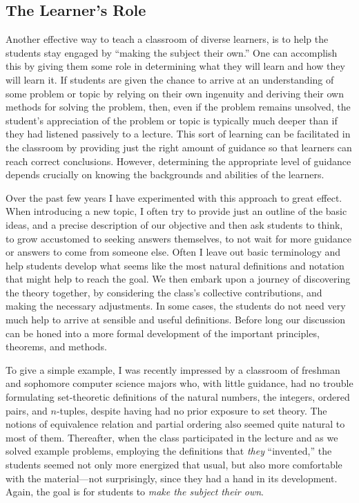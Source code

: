 \subsection{The Learner's Role} Another effective way to teach a classroom of diverse learners, is to help the students stay engaged by ``making the subject their own.''  One can accomplish this by giving them some role in determining what they will learn and how they will learn it.  If students are given the chance to arrive at an understanding of some problem or topic by relying on their own ingenuity and deriving their own methods for solving the problem, then, even if the problem remains unsolved, the student's appreciation of the problem or topic is typically much deeper than if they had listened passively to a lecture. This sort of learning can be facilitated in the classroom by providing just the right amount of guidance so that learners can reach correct conclusions.  However, determining the appropriate level of guidance depends crucially on knowing the backgrounds and abilities of the learners.

Over the past few years I have experimented with this approach to great effect.  When introducing a new topic, I often try to provide just an outline of the basic ideas, and a precise description of our objective and then ask students to think, to grow accustomed to seeking answers themselves, to not wait for more guidance or answers to come from someone else. Often I leave out basic terminology and help students develop what seems like the most natural definitions and notation that might help to reach the goal. We then embark upon a journey of discovering the theory together, by considering the class's collective contributions, and making the necessary adjustments. In some cases, the students do not need very much help to arrive at sensible and useful definitions. Before long our discussion can be honed into a more formal development of the important principles, theorems, and methods.

To give a simple example, I was recently impressed by a classroom of freshman and sophomore computer science majors who, with little guidance, had no trouble formulating set-theoretic definitions of the natural numbers, the integers, ordered pairs, and $n$-tuples, despite having had no prior exposure to set theory. The notions of equivalence relation and partial ordering also seemed quite natural to most of them. Thereafter, when the class participated in the lecture and as we solved example problems, employing the definitions that \emph{they} ``invented,'' the students seemed not only more energized that usual, but also  more comfortable with the material---not surprisingly, since they had a hand in its development. Again, the goal is for students to \emph{make the subject their own}.  

